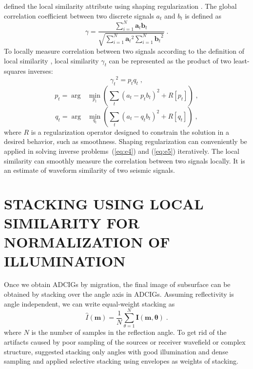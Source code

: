 \cite{Fomel2007b} defined the local similarity attribute using shaping regularization \cite[]{Fomel2007a}. The global correlation coefficient between two discrete signals $a_t$ and $b_t$ is defined as
\begin{equation}
  \label{eq:e2}
  \gamma = \frac{\sum_{i=1}^{N} \mathbf{a}_t \mathbf{b}_t}{\sqrt{\sum_{i=1}^{N} 
  {\mathbf{a}_t}^{2} \sum_{i=1}^{N} {\mathbf{b}_t}^2}}\;.
\end{equation}
To locally measure correlation between two signals according to the definition of local similarity \cite[]{Fomel2007b, Fomel2009}, local similarity $\gamma_t$ can be represented as the product of two least-squares inverses:
\begin{equation}
  \label{eq:e3}
  {\gamma_t}^2 = p_t q_t\;,
\end{equation}
\begin{equation}
  \label{eq:e4}
  p_t = \arg \,\,\,\, \min_{p_t} \left(\sum_{t}\left(a_t-p_tb_t\right)^2+R\left[p_t\right]\right)\;,
\end{equation}
\begin{equation}
  \label{eq:e5}
  q_t = \arg \,\,\,\, \min_{q_t} \left(\sum_{t}\left(a_t-q_tb_t\right)^2+R\left[q_t\right]\right)\;,
\end{equation}
where $R$ is a regularization operator designed to constrain the solution in a desired behavior, such as smoothness. Shaping regularization \cite[]{Fomel2007a} can conveniently be applied in solving inverse problems~(\ref{eq:e4}) and (\ref{eq:e5}) iteratively. The local similarity can smoothly measure the correlation between two signals locally. It is an estimate of waveform similarity of two seismic signals.

\section{STACKING USING LOCAL SIMILARITY FOR NORMALIZATION OF ILLUMINATION}

Once we obtain ADCIGs by migration, the final image of subsurface can be obtained by stacking over the angle axis in ADCIGs. Assuming reflectivity is angle independent, we can write equal-weight stacking as
\begin{equation}
  \label{eq:e6}
  \widehat{I} (\mathbf{m}) = \frac{1}{N} \sum_{\theta=1}^{N}\mathbf{I}(\mathbf{m},\mathbf{\theta})\;.
\end{equation}
where $N$ is the number of samples in the reflection angle. To get rid of the artifacts caused by poor sampling of the sources or receiver wavefield or complex structure, \cite{Tang} suggested stacking only angles with good illumination and dense sampling and applied selective stacking using envelopes as weights of stacking. 

